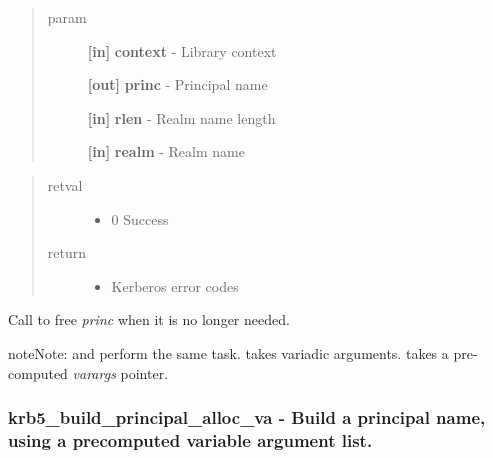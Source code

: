 \documentclass[letterpaper,10pt,english]{sphinxmanual}
\begin{document}
\begin{quote}\begin{description}
\item[{param}] \leavevmode
\textbf{{[}in{]}} \textbf{context} - Library context

\textbf{{[}out{]}} \textbf{princ} - Principal name

\textbf{{[}in{]}} \textbf{rlen} - Realm name length

\textbf{{[}in{]}} \textbf{realm} - Realm name

\end{description}\end{quote}
\begin{quote}\begin{description}
\item[{retval}] \leavevmode\begin{itemize}
\item {} 
0   Success

\end{itemize}

\item[{return}] \leavevmode\begin{itemize}
\item {} 
Kerberos error codes

\end{itemize}

\end{description}\end{quote}

Call {\hyperref[appdev/refs/api/krb5_free_principal:krb5_free_principal]{}} to free \emph{princ} when it is no longer needed.

\begin{notice}{note}{Note:}
{\hyperref[appdev/refs/api/krb5_build_principal:krb5_build_principal]{}} and {\hyperref[appdev/refs/api/krb5_build_principal_alloc_va:krb5_build_principal_alloc_va]{}} perform the same task. {\hyperref[appdev/refs/api/krb5_build_principal:krb5_build_principal]{}} takes variadic arguments. {\hyperref[appdev/refs/api/krb5_build_principal_alloc_va:krb5_build_principal_alloc_va]{}} takes a pre-computed \emph{varargs} pointer.
\end{notice}


\subsubsection{krb5\_build\_principal\_alloc\_va -  Build a principal name, using a precomputed variable argument list.}
\label{appdev/refs/api/krb5_build_principal_alloc_va:krb5-build-principal-alloc-va-build-a-principal-name-using-a-precomputed-variable-argument-list}\label{appdev/refs/api/krb5_build_principal_alloc_va::doc}
\end{document}
